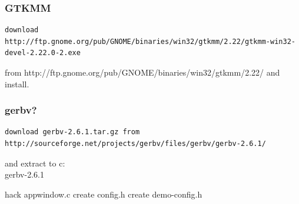 \documentclass[a4paper,11pt]{article}  %
\begin{document}
\subsubsection{GTKMM}
\begin{lstlisting}[frame=single,breaklines=true]
download http://ftp.gnome.org/pub/GNOME/binaries/win32/gtkmm/2.22/gtkmm-win32-devel-2.22.0-2.exe
\end{lstlisting}
from http://ftp.gnome.org/pub/GNOME/binaries/win32/gtkmm/2.22/
and install.

\subsubsection{gerbv?}
\begin{lstlisting}[frame=single,breaklines=true]
download gerbv-2.6.1.tar.gz from http://sourceforge.net/projects/gerbv/files/gerbv/gerbv-2.6.1/
\end{lstlisting}
and extract to c:\\gerbv-2.6.1

hack appwindow.c
create config.h
create demo-config.h
\end{document}
